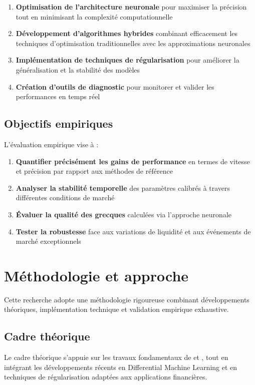 \begin{enumerate}
\item \textbf{Optimisation de l'architecture neuronale} pour maximiser la précision tout en minimisant la complexité computationnelle
\item \textbf{Développement d'algorithmes hybrides} combinant efficacement les techniques d'optimisation traditionnelles avec les approximations neuronales
\item \textbf{Implémentation de techniques de régularisation} pour améliorer la généralisation et la stabilité des modèles
\item \textbf{Création d'outils de diagnostic} pour monitorer et valider les performances en temps réel
\end{enumerate}

\subsection{Objectifs empiriques}

L'évaluation empirique vise à :

\begin{enumerate}
\item \textbf{Quantifier précisément les gains de performance} en termes de vitesse et précision par rapport aux méthodes de référence
\item \textbf{Analyser la stabilité temporelle} des paramètres calibrés à travers différentes conditions de marché
\item \textbf{Évaluer la qualité des grecques} calculées via l'approche neuronale
\item \textbf{Tester la robustesse} face aux variations de liquidité et aux événements de marché exceptionnels
\end{enumerate}

\section{Méthodologie et approche}

Cette recherche adopte une méthodologie rigoureuse combinant développements théoriques, implémentation technique et validation empirique exhaustive.

\subsection{Cadre théorique}

Le cadre théorique s'appuie sur les travaux fondamentaux de \citet{bayer2018deep} et \citet{bayer2019deep}, tout en intégrant les développements récents en Differential Machine Learning \citep{huge2020differential} et en techniques de régularisation adaptées aux applications financières.

